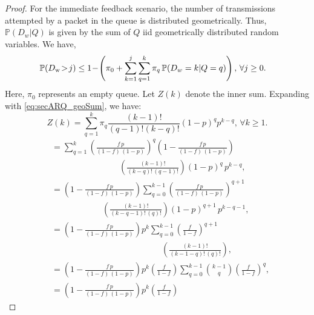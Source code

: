 \begin{proof}
For the immediate feedback scenario, the number of transmissions attempted by a packet in the queue is distributed geometrically. Thus, $\mathbb{P}(D_w\vert Q)$ is given by the sum of $Q$ iid geometrically distributed random variables. We have,
\begin{align*}
\mathbb{P}(D_{\mathrm{w}}\!>\!j)&\leq 1\!-\!\left(\pi_0+\sum_{k=1}^{j}\sum_{q=1}^{k}\pi_q\,\mathbb{P}(D_w=k\vert Q=q)\right),\,\forall j\geq0.
\end{align*}
 Here, $\pi_0$ represents an empty queue. Let $Z(k)$ denote the inner sum. Expanding with \eqref{eq:secARQ_geoSum}, we have:
 \begin{equation}
Z(k)=\sum_{q=1}^{k}\pi_q\dfrac{(k-1)!}{(q-1)!(k-q)!}(1-p)^qp^{k-q},\,\forall k\geq1.
 \end{equation}
\begin{align*}
&=\sum_{q=1}^{k} 
\left( \frac{f \, p}{(1 - f) \, (1 - p)} \right)^q 
\left(1 - \frac{f \, p}{(1 - f) \, (1 - p)} \right)\\&\hspace{8em}
\left( \frac{(k - 1)!}{(k - q)!\,(q - 1)!} \right)
(1 - p)^q \, p^{k - q},\\
&=\left(1 - \frac{f \, p}{(1 - f) \, (1 - p)} \right)\sum_{q=0}^{k-1} 
\left( \frac{f \, p}{(1 - f) \, (1 - p)} \right)^{q+1} \\&\hspace{6em}
\left( \frac{(k - 1)!}{(k - q-1)!\,(q)!} \right)
(1 - p)^{q+1} \, p^{k - q-1},\\
&=\left(1 - \frac{f \, p}{(1 - f) \, (1 - p)} \right)
p^{k}
\sum_{q=0}^{k-1} 
\left( \frac{f}{1 - f} \right)^{q+1}\\&\hspace{13em}
\left( \frac{(k - 1)!}{(k - 1 -q)!\,(q)!} \right),\\
&=\left(1 - \frac{f \, p}{(1 - f) \, (1 - p)} \right)
p^{k}\left( \frac{f}{1 - f} \right)
\sum_{q=0}^{k-1} {\binom{k-1}{q}}
\left( \frac{f}{1 - f} \right)^{q},\\
&=\left(1 - \frac{f \, p}{(1 - f) \, (1 - p)} \right)
p^{k}\left( \frac{f}{1 - f} \right)

\end{align*}
\end{proof}
